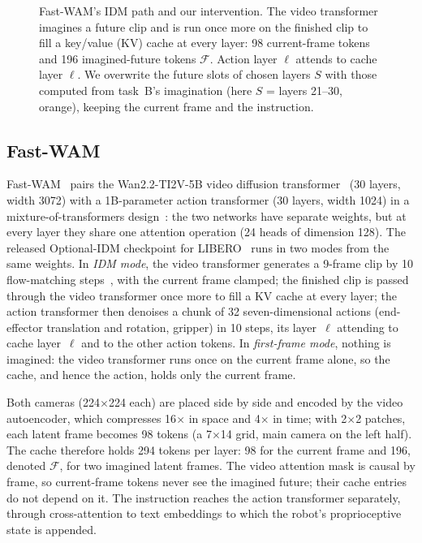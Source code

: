 \documentclass[conference]{IEEEtran}
\newcommand{\Fut}{\mathcal{F}}
\begin{document}
\begin{figure}[t]
\caption{Fast-WAM's IDM path and our intervention. The video transformer imagines a future clip and is run once more on
the finished clip to fill a key/value (KV) cache at every layer: 98 current-frame tokens and 196 imagined-future tokens
$\Fut$. Action layer $\ell$ attends to cache layer $\ell$. We overwrite the future slots of chosen layers $S$ with those
computed from task~B's imagination (here $S$ = layers 21--30, orange), keeping the current frame and the instruction.}
\label{fig:method}
\end{figure}

\subsection{Fast-WAM}
Fast-WAM~\cite{yuan2026fastwam} pairs the Wan2.2-TI2V-5B video diffusion transformer~\cite{wan2025wan} (30 layers,
width 3072) with a 1B-parameter action transformer (30 layers, width 1024) in a mixture-of-transformers
design~\cite{liang2025mot}: the two networks have separate weights, but at every layer they share one attention
operation (24 heads of dimension 128). The released Optional-IDM checkpoint for LIBERO~\cite{liu2023libero} runs in two
modes from the same weights. In \emph{IDM mode}, the video transformer generates a 9-frame clip by 10 flow-matching
steps~\cite{lipman2022flow,liu2022rectified}, with the current frame clamped; the finished clip is passed through the
video transformer once more to fill a KV cache at every layer; the action transformer then denoises a chunk of 32
seven-dimensional actions (end-effector translation and rotation, gripper) in 10 steps, its layer~$\ell$ attending to
cache layer~$\ell$ and to the other action tokens. In \emph{first-frame mode}, nothing is imagined: the video
transformer runs once on the current frame alone, so the cache, and hence the action, holds only the current frame.

Both cameras (224$\times$224 each) are placed side by side and encoded by the video autoencoder, which compresses 16$\times$
in space and 4$\times$ in time; with 2$\times$2 patches, each latent frame becomes 98 tokens (a 7$\times$14 grid, main
camera on the left half). The cache therefore holds 294 tokens per layer: 98 for the current frame and 196, denoted
$\Fut$, for two imagined latent frames. The video attention mask is causal by frame, so current-frame tokens never see
the imagined future; their cache entries do not depend on it. The instruction reaches the action transformer separately,
through cross-attention to text embeddings to which the robot's proprioceptive state is appended.
\end{document}
